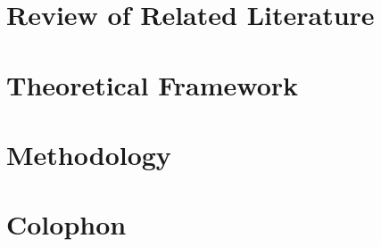  







\begin{SingleSpace}
	\tableofcontents
	\cleardoublepage
	
	\listoffigures
	\cleardoublepage
	
\end{SingleSpace}

\DoubleSpacing
{}

\chapter{Review of Related Literature} 
	\label{ch:rrl} 
	
	\clearpage

\chapter{Theoretical Framework} 
	\label{ch:theory} 
	
	\clearpage

\chapter{Methodology}
	\label{ch:method}
	
	\clearpage


\printbibliography

\clearpage

\appendix
\chapter{Colophon}
	



